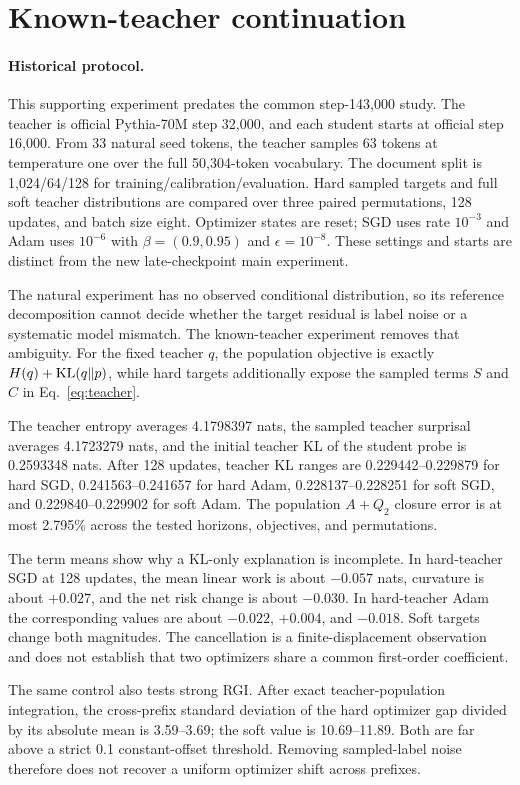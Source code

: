 \section{Known-teacher continuation}

\paragraph{Historical protocol.}
This supporting experiment predates the common step-143,000 study.  The teacher is official Pythia-70M step 32,000, and each student starts at official step 16,000.  From 33 natural seed tokens, the teacher samples 63 tokens at temperature one over the full 50,304-token vocabulary.  The document split is 1,024/64/128 for training/calibration/evaluation.  Hard sampled targets and full soft teacher distributions are compared over three paired permutations, 128 updates, and batch size eight.  Optimizer states are reset; SGD uses rate $10^{-3}$ and Adam uses $10^{-6}$ with $\beta=(0.9,0.95)$ and $\epsilon=10^{-8}$.  These settings and starts are distinct from the new late-checkpoint main experiment.

The natural experiment has no observed conditional distribution, so its reference decomposition cannot decide whether the target residual is label noise or a systematic model mismatch.  The known-teacher experiment removes that ambiguity.  For the fixed teacher \(q\), the population objective is exactly \(H(q)+\operatorname{KL}(q\Vert p)\), while hard targets additionally expose the sampled terms \(S\) and \(C\) in Eq.~\eqref{eq:teacher}.

The teacher entropy averages 4.1798397 nats, the sampled teacher surprisal averages 4.1723279 nats, and the initial teacher KL of the student probe is 0.2593348 nats.  After 128 updates, teacher KL ranges are 0.229442--0.229879 for hard SGD, 0.241563--0.241657 for hard Adam, 0.228137--0.228251 for soft SGD, and 0.229840--0.229902 for soft Adam.  The population \(A+Q_2\) closure error is at most 2.795\% across the tested horizons, objectives, and permutations.

The term means show why a KL-only explanation is incomplete.  In hard-teacher SGD at 128 updates, the mean linear work is about \(-0.057\) nats, curvature is about \(+0.027\), and the net risk change is about \(-0.030\).  In hard-teacher Adam the corresponding values are about \(-0.022\), \(+0.004\), and \(-0.018\).  Soft targets change both magnitudes.  The cancellation is a finite-displacement observation and does not establish that two optimizers share a common first-order coefficient.

The same control also tests strong RGI.  After exact teacher-population integration, the cross-prefix standard deviation of the hard optimizer gap divided by its absolute mean is 3.59--3.69; the soft value is 10.69--11.89.  Both are far above a strict 0.1 constant-offset threshold.  Removing sampled-label noise therefore does not recover a uniform optimizer shift across prefixes.
